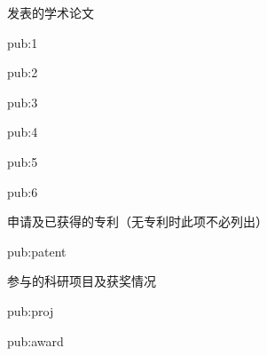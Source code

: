 \begin{achievements}
  \begin{pubgroup}{发表的学术论文}
    \item{pub:1}
    \item{pub:2}
    \item{pub:3}
    \item{pub:4}
    \item{pub:5}
    \item{pub:6}
  \end{pubgroup}
  \begin{pubgroup}{申请及已获得的专利（无专利时此项不必列出）}
    \item{pub:patent}
  \end{pubgroup}
  \begin{pubgroup}{参与的科研项目及获奖情况}
    \item{pub:proj}
    \item{pub:award}
  \end{pubgroup}
\end{achievements}
